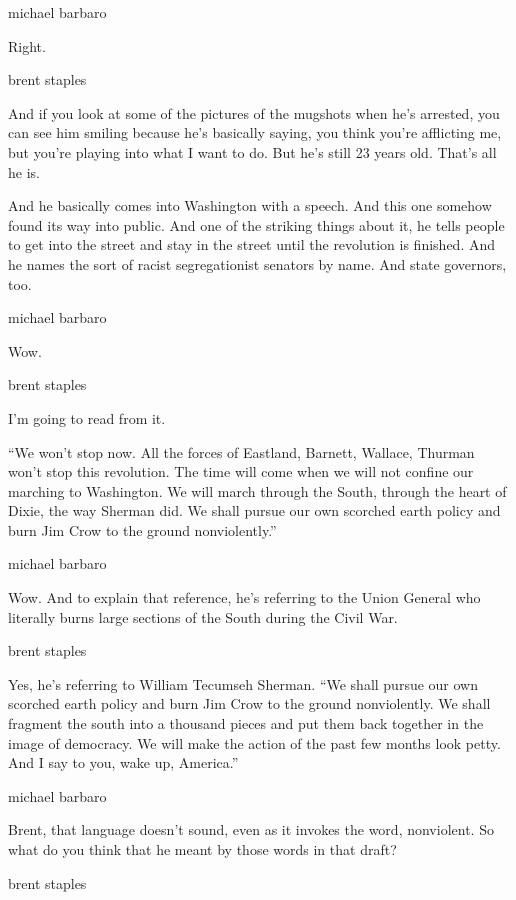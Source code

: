 michael barbaro

Right.

brent staples

And if you look at some of the pictures of the mugshots when he's
arrested, you can see him smiling because he's basically saying, you
think you're afflicting me, but you're playing into what I want to do.
But he's still 23 years old. That's all he is.

And he basically comes into Washington with a speech. And this one
somehow found its way into public. And one of the striking things about
it, he tells people to get into the street and stay in the street until
the revolution is finished. And he names the sort of racist
segregationist senators by name. And state governors, too.

michael barbaro

Wow.

brent staples

I'm going to read from it.

``We won't stop now. All the forces of Eastland, Barnett, Wallace,
Thurman won't stop this revolution. The time will come when we will not
confine our marching to Washington. We will march through the South,
through the heart of Dixie, the way Sherman did. We shall pursue our own
scorched earth policy and burn Jim Crow to the ground nonviolently.''

michael barbaro

Wow. And to explain that reference, he's referring to the Union General
who literally burns large sections of the South during the Civil War.

brent staples

Yes, he's referring to William Tecumseh Sherman. ``We shall pursue our
own scorched earth policy and burn Jim Crow to the ground nonviolently.
We shall fragment the south into a thousand pieces and put them back
together in the image of democracy. We will make the action of the past
few months look petty. And I say to you, wake up, America.''

michael barbaro

Brent, that language doesn't sound, even as it invokes the word,
nonviolent. So what do you think that he meant by those words in that
draft?

brent staples

